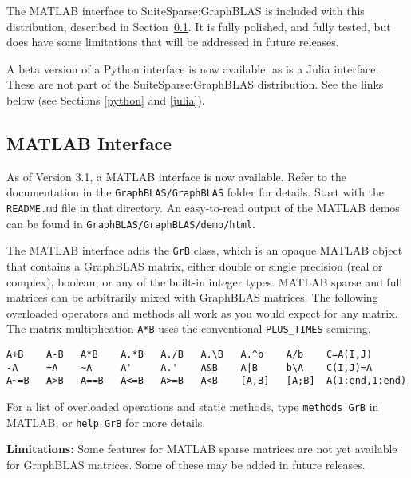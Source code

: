 \documentclass[12pt]{article}
\begin{document}
The MATLAB interface to SuiteSparse:GraphBLAS is included with this
distribution, described in Section~\ref{matlab}.
It is fully polished, and fully tested, but does have
some limitations that will be addressed in future releases.

A beta version of a Python interface is now available, as is a
Julia interface.  These are not part of the SuiteSparse:GraphBLAS distribution.
See the links below (see Sections \ref{python} and \ref{julia}).

\subsection{MATLAB Interface}
\label{matlab}

As of Version 3.1, a MATLAB interface is now available.  Refer to the
documentation in the \verb'GraphBLAS/GraphBLAS' folder for details.  Start with
the \verb'README.md' file in that directory.  An easy-to-read output of the
MATLAB demos can be found in \verb'GraphBLAS/GraphBLAS/demo/html'.

The MATLAB interface adds the \verb'GrB' class, which is an opaque MATLAB
object that contains a GraphBLAS matrix, either double or single precision
(real or complex), boolean, or any of the built-in integer types.  MATLAB
sparse and full matrices can be arbitrarily mixed with GraphBLAS matrices.  The
following overloaded operators and methods all work as you would expect for any
matrix.  The matrix multiplication \verb'A*B' uses the conventional
\verb'PLUS_TIMES' semiring.

{\footnotesize
\begin{verbatim}
A+B    A-B   A*B    A.*B   A./B   A.\B   A.^b    A/b    C=A(I,J)
-A     +A    ~A     A'     A.'    A&B    A|B     b\A    C(I,J)=A
A~=B   A>B   A==B   A<=B   A>=B   A<B    [A,B]   [A;B]  A(1:end,1:end) \end{verbatim}}

For a list of overloaded operations and static methods, type
\verb'methods GrB' in MATLAB, or \verb'help GrB' for more details.

{\bf Limitations:}
Some features for MATLAB sparse matrices are not yet available for
GraphBLAS matrices.  Some of these may be added in future releases.
\end{document}
